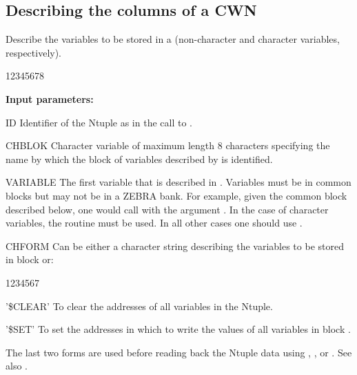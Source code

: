 \newpage%

\subsection{Describing the columns of a CWN}
\label{HNTUDESC}


\Action
Describe the variables to be stored in a \CWN{}
(non-character and character variables, respectively).
 
\begin{DLtt}{12345678}
\item[{\rm\bf Input parameters:}]
\item[ID]     Identifier of the Ntuple as in the call to .
\item[CHBLOK] Character variable of maximum length 8 characters 
              specifying the name by which the block
              of variables described by  is identified.
\item[VARIABLE] 
              The first variable that is described in .
              Variables must be in common blocks but may not be
              in a ZEBRA bank.
              For example, given the common block  described
              below, one would call  with the argument .
              In the case of character variables, the routine
               must be used. In all other cases one 
              should use . 
\item[CHFORM] Can be either a character string describing the variables
              to be stored in block  or:
   \begin{DLtt}{1234567}
     \item['\$CLEAR'] To clear the addresses of all variables in the Ntuple.
     \item['\$SET'] To set the addresses in which to write the values of
                    all variables in block .
   \end{DLtt}
             The last two forms are used before reading back the Ntuple data
             using , ,  or .
             See also .
\end{DLtt}

